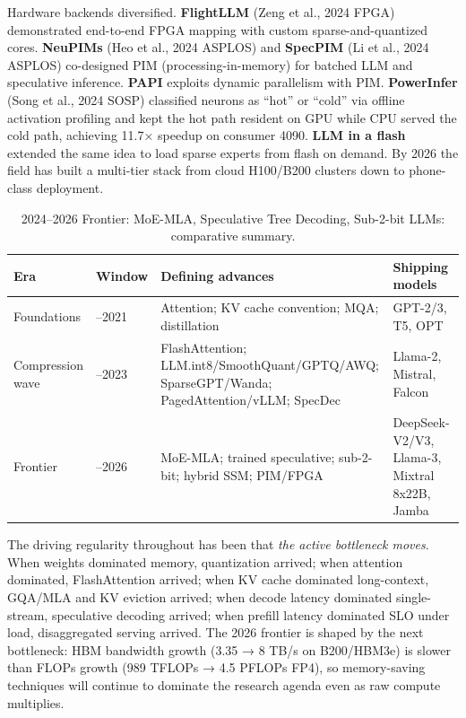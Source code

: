 \documentclass{article}
\begin{document}
Hardware backends diversified. \textbf{FlightLLM} (Zeng et al., 2024 FPGA) demonstrated end-to-end FPGA mapping with custom sparse-and-quantized cores. \textbf{NeuPIMs} (Heo et al., 2024 ASPLOS) and \textbf{SpecPIM} (Li et al., 2024 ASPLOS) co-designed PIM (processing-in-memory) for batched LLM and speculative inference. \textbf{PAPI} \citep{he20252025} exploits dynamic parallelism with PIM. \textbf{PowerInfer} (Song et al., 2024 SOSP) classified neurons as ``hot'' or ``cold'' via offline activation profiling and kept the hot path resident on GPU while CPU served the cold path, achieving 11.7× speedup on consumer 4090. \textbf{LLM in a flash} \citep{alizadeh20242024} extended the same idea to load sparse experts from flash on demand. By 2026 the field has built a multi-tier stack from cloud H100/B200 clusters down to phone-class deployment.

\begin{table}[t]
\centering
\caption{2024--2026 Frontier: MoE-MLA, Speculative Tree Decoding, Sub-2-bit LLMs: comparative summary.}
\label{tab:2024-2026-frontier-moe-mla-speculative-tree-decoding-sub-2-b}
\begin{tabular}{>{\raggedright\arraybackslash}p{0.0988\linewidth}
  >{\raggedright\arraybackslash}p{0.0556\linewidth}
  >{\raggedright\arraybackslash}p{0.5679\linewidth}
  >{\raggedright\arraybackslash}p{0.2778\linewidth}}
\toprule
Era & Window & Defining advances & Shipping models \\
\midrule
Foundations & 2017--2021 & Attention; KV cache convention; MQA; distillation & GPT-2/3, T5, OPT \\
Compression wave & 2022--2023 & FlashAttention; LLM.int8/SmoothQuant/GPTQ/AWQ; SparseGPT/Wanda; PagedAttention/vLLM; SpecDec & Llama-2, Mistral, Falcon \\
Frontier & 2024--2026 & MoE-MLA; trained speculative; sub-2-bit; hybrid SSM; PIM/FPGA & DeepSeek-V2/V3, Llama-3, Mixtral 8x22B, Jamba \\
\end{tabular}
\end{table}

The driving regularity throughout has been that \emph{the active bottleneck moves}. When weights dominated memory, quantization arrived; when attention dominated, FlashAttention arrived; when KV cache dominated long-context, GQA/MLA and KV eviction arrived; when decode latency dominated single-stream, speculative decoding arrived; when prefill latency dominated SLO under load, disaggregated serving arrived. The 2026 frontier is shaped by the next bottleneck: HBM bandwidth growth (3.35 → 8 TB/s on B200/HBM3e) is slower than FLOPs growth (989 TFLOPs → 4.5 PFLOPs FP4), so memory-saving techniques will continue to dominate the research agenda even as raw compute multiplies.
\end{document}
